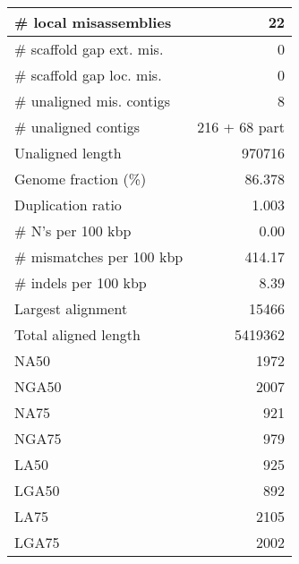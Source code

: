 \documentclass[12pt,a4paper]{article}
\begin{document}
\begin{table}[ht]
\begin{center}
\begin{tabular}{|l*{1}{|r}|}
\# local misassemblies & 22 \\ \hline
\# scaffold gap ext. mis. & 0 \\ \hline
\# scaffold gap loc. mis. & 0 \\ \hline
\# unaligned mis. contigs & 8 \\ \hline
\# unaligned contigs & 216 + 68 part \\ \hline
Unaligned length & 970716 \\ \hline
Genome fraction (\%) & 86.378 \\ \hline
Duplication ratio & 1.003 \\ \hline
\# N's per 100 kbp & 0.00 \\ \hline
\# mismatches per 100 kbp & 414.17 \\ \hline
\# indels per 100 kbp & 8.39 \\ \hline
Largest alignment & 15466 \\ \hline
Total aligned length & 5419362 \\ \hline
NA50 & 1972 \\ \hline
NGA50 & 2007 \\ \hline
NA75 & 921 \\ \hline
NGA75 & 979 \\ \hline
LA50 & 925 \\ \hline
LGA50 & 892 \\ \hline
LA75 & 2105 \\ \hline
LGA75 & 2002 \\ \hline
\end{tabular}
\end{center}
\end{table}
\end{document}
